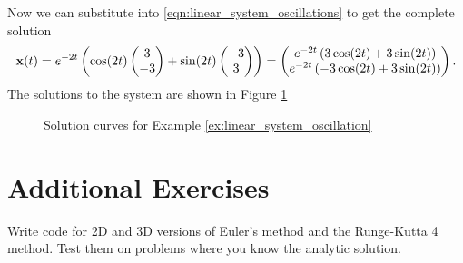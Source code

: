 \begin{example}
    Now we can substitute into \eqref{eqn:linear_system_oscillations} to get the complete
    solution
    \[ {\bf x}(t) = e^{-2t} \left( \cos(2t) \begin{pmatrix} 3 \\ -3 \end{pmatrix} + \sin(2t)
    \begin{pmatrix} -3 \\ 3 \end{pmatrix} \right) = \begin{pmatrix} e^{-2t} \left( 3
        \cos(2t) + 3 \sin(2t)
    \right) \\ e^{-2t} \left( -3\cos(2t) + 3\sin(2t) \right) \end{pmatrix}. \]
    The solutions to the system are shown in Figure \ref{fig:linear_system_oscillation}
\end{example}

\begin{figure}
    \begin{center}
    \end{center}
    \caption{Solution curves for Example \ref{ex:linear_system_oscillation}}
    \label{fig:linear_system_oscillation}
\end{figure}


\newpage\section{Additional Exercises}
\begin{problem}
    Write code for 2D and 3D versions of Euler's method and the Runge-Kutta 4 method.
    Test them on problems where you know the analytic solution.
\end{problem}

